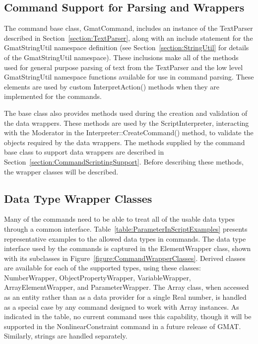 \subsection{Command Support for Parsing and Wrappers}

The command base class, GmatCommand, includes an instance of the TextParser described in
Section~\ref{section:TextParser}, along with an include statement for the GmatStringUtil namespace
definition (see Section~\ref{section:StringUtil} for details of the GmatStringUtil namespace).
These inclusions make all of the methods used for general purpose parsing of text from the
TextParser and the low level GmatStringUtil namespace functions available for use in command
parsing.  These elements are used by custom InterpretAction() methods when they are implemented for
the commands.

The base class also provides methods used during the creation and validation of the data wrappers.
These methods are used by the ScriptInterpreter, interacting with the Moderator in the
Interpreter::CreateCommand() method, to validate the objects required by the data wrappers.  The
methods supplied by the command base class to support data wrappers are described in
Section~\ref{section:CommandScriptingSupport}.  Before describing these methods, the wrapper
classes will be described.

\subsection{\label{section:DataWrappers}Data Type Wrapper
Classes}

Many of the commands need to be able to treat all of the usable data types through a common
interface.  Table~\ref{table:ParameterInScriptExamples} presents representative examples to the
allowed data types in commands.  The data type interface used by the commands is captured in the
ElementWrapper class, shown with its subclasses in Figure~\ref{figure:CommandWrapperClasses}.
Derived classes are available for each of the supported types, using these classes:
NumberWrapper, ObjectPropertyWrapper, VariableWrapper, ArrayElementWrapper, and ParameterWrapper.
The Array class, when accessed as an entity rather than as a data provider for a single Real number,
is handled as a special case by any command designed to work with Array instances.  As indicated in
the table, no current command uses this capability, though it will be supported in the
NonlinearConstraint command in a future release of GMAT.  Similarly, strings are handled separately.

